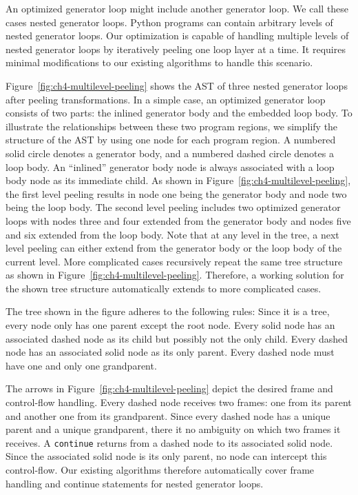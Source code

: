 An optimized generator loop might include another generator loop.
We call these cases nested generator loops.
Python programs can contain arbitrary levels of nested generator loops.
Our optimization is capable of handling multiple levels of nested generator loops by iteratively peeling one loop layer at a time.
It requires minimal modifications to our existing algorithms to handle this scenario.

Figure~\ref{fig:ch4-multilevel-peeling} shows the AST of three nested generator loops after peeling transformations.
In a simple case, an optimized generator loop consists of two parts: the inlined generator body and the embedded loop body.
To illustrate the relationships between these two program regions, we simplify the structure of the AST by using one node for each program region.
A numbered solid circle denotes a generator body, and a numbered dashed circle denotes a loop body.
An ``inlined'' generator body node is always associated with a loop body node as its immediate child.
As shown in Figure~\ref{fig:ch4-multilevel-peeling}, the first level peeling results in node one being the generator body and node two being the loop body.
The second level peeling includes two optimized generator loops with nodes three and four extended from the generator body and nodes five and six extended from the loop body.
Note that at any level in the tree, a next level peeling can either extend from the generator body or the loop body of the current level.
More complicated cases recursively repeat the same tree structure as shown in Figure~\ref{fig:ch4-multilevel-peeling}.
Therefore, a working solution for the shown tree structure automatically extends to more complicated cases.

The tree shown in the figure adheres to the following rules:
Since it is a tree, every node only has one parent except the root node.
Every solid node has an associated dashed node as its child but possibly not the only child.
Every dashed node has an associated solid node as its only parent.
Every dashed node must have one and only one grandparent.

The arrows in Figure~\ref{fig:ch4-multilevel-peeling} depict the desired frame and control-flow handling.
Every dashed node receives two frames: one from its parent and another one from its grandparent.
Since every dashed node has a unique parent and a unique grandparent, there it no ambiguity on which two frames it receives.
A \texttt{continue} returns from a dashed node to its associated solid node.
Since the associated solid node is its only parent, no node can intercept this control-flow.
Our existing algorithms therefore automatically cover frame handling and continue statements for nested generator loops.


